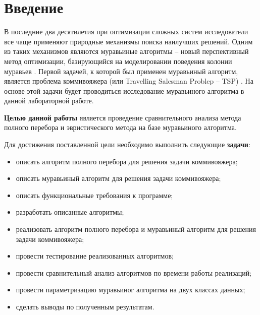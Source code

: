 \chapter*{Введение}

В последние два десятилетия при оптимизации сложных систем исследователи все
чаще применяют природные механизмы поиска наилучших решений. Одним из таких
механизмов являются муравьиные алгоритмы -- новый перспективный метод
оптимизации, базирующийся на моделировании поведения колонии муравьев
\cite{Shtovba}. Первой задачей, к которой был применен муравьиный алгоритм,
является проблема коммивояжера (или Travelling Salesman Problep -- TSP)
\cite{Zaychenko}. На основе этой задачи будет проводиться исследование
муравьиного алгоритма в данной лабораторной работе.

\textbf{Целью данной работы} является проведение сравнительного анализа метода
полного перебора и эвристического метода на базе муравьиного алгоритма.

Для достижения поставленной цели необходимо выполнить следующие
\textbf{задачи}:
\begin{itemize}[left=\parindent]
    \item описать алгоритм полного перебора для решения задачи коммивояжера;
    \item описать муравьиный алгоритм для решения задачи коммивояжера; 
    \item описать функциональные требования к программе;
    \item разработать описанные алгоритмы;
    \item реализовать алгоритм полного перебора и муравьиный алгоритм для
        решения задачи коммивояжера;
    \item провести тестирование реализованных алгоритмов;
    \item провести сравнительный анализ алгоритмов по времени работы
          реализаций;
    \item провести параметризацию муравьиног алгоритма на двух классах данных;
    \item сделать выводы по полученным результатам.
\end{itemize}
